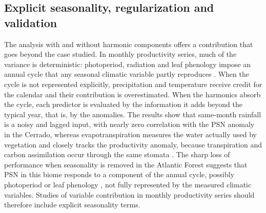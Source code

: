 \documentclass[a4paper,fleqn]{cas-sc}
\begin{document}
\subsection{Explicit seasonality, regularization and validation}

The analysis with and without harmonic components offers a contribution that goes beyond the case studied. In monthly productivity series, much of the variance is deterministic: photoperiod, radiation and leaf phenology impose an annual cycle that any seasonal climatic variable partly reproduces \citep{wu2016,alberton2019}. When the cycle is not represented explicitly, precipitation and temperature receive credit for the calendar and their contribution is overestimated. When the harmonics absorb the cycle, each predictor is evaluated by the information it adds beyond the typical year, that is, by the anomalies. The results show that same-month rainfall is a noisy and lagged input, with nearly zero correlation with the PSN anomaly in the Cerrado, whereas evapotranspiration measures the water actually used by vegetation and closely tracks the productivity anomaly, because transpiration and carbon assimilation occur through the same stomata \citep{lawson2019}. The sharp loss of performance when seasonality is removed in the Atlantic Forest suggests that PSN in this biome responds to a component of the annual cycle, possibly photoperiod or leaf phenology \citep{borchert2001,wu2016}, not fully represented by the measured climatic variables. Studies of variable contribution in monthly productivity series should therefore include explicit seasonality terms.
\end{document}
